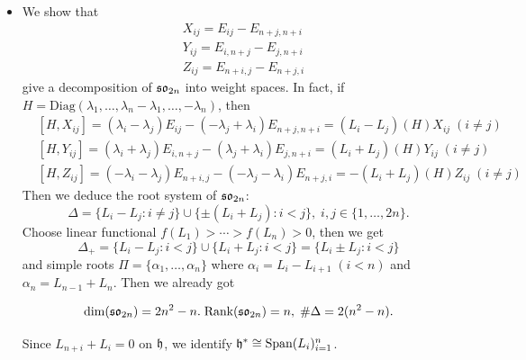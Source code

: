 \begin{itemize}
    \item We show that 
    \begin{equation}
        \begin{split}
            &X_{ij}=E_{ij}-E_{n+j,n+i}\\
            &Y_{ij}=E_{i,n+j}-E_{j,n+i}\\
            &Z_{ij}=E_{n+i,j}-E_{n+j,i}
        \end{split}
    \end{equation}
    give a decomposition of $\mathfrak{so}_{2n}$ into weight spaces. 
    In fact, if $H=\text{Diag}(\lambda_1,\dots,\lambda_n-\lambda_1,\dots,-\lambda_n)$, then
    \begin{equation}
        \begin{split}
            &[H,X_{ij}]=(\lambda_i-\lambda_j)E_{ij}-(-\lambda_{j}+\lambda_i)E_{n+j,n+i}=(L_i-L_j)(H)X_{ij}\;(i\neq j)\\
            &[H,Y_{ij}]=(\lambda_i+\lambda_j)E_{i,n+j}-(\lambda_j+\lambda_i)E_{j,n+i}=(L_i+L_j)(H)Y_{ij}\;(i\neq j)\\
            &[H,Z_{ij}]=(-\lambda_i-\lambda_j)E_{n+i,j}-(-\lambda_j-\lambda_i)E_{n+j,i}=-(L_i+L_j)(H)Z_{ij}\;(i\neq j)
        \end{split}
    \end{equation}
    Then we deduce the root system of $\mathfrak{so}_{2n}$:
    \begin{equation}
        \Delta=\{L_i-L_j:i\neq j\}\cup\{\pm(L_i+L_j):i<j\},\;i,j\in\{1,\dots, 2n\}.
    \end{equation}
    Choose linear functional $f(L_1)>\cdots>f(L_n)>0$, then we get 
    \begin{equation}
        \Delta_+=\{L_i-L_j:i<j\}\cup\{L_i+L_j:i<j\}=\{L_i\pm L_j:i<j\}
    \end{equation}
    and simple roots $\Pi=\{\alpha_1,\dots,\alpha_{n}\}$ where $\alpha_i=L_i-L_{i+1}\;(i< n)$ and $\alpha_n=L_{n-1}+L_n$. 
    Then we already got 
    \begin{dang}
        \begin{equation}
            \dim(\mathfrak{so}_{2n})=2n^2-n.\;\text{Rank}(\mathfrak{so}_{2n})=n,\;\#\Delta=2(n^2-n).        
        \end{equation}
    \end{dang}


    \begin{dang}
        \begin{remark}
            Since $L_{n+i}+L_i=0$ on $\mathfrak{h}$, we identify $\mathfrak{h}^*\cong\text{Span}(L_i)_{i=1}^n$.
        \end{remark}
    \end{dang}


\end{itemize}
